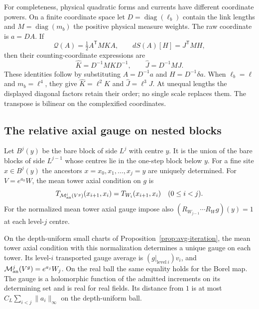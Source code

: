 \documentclass[11pt,letterpaper,reqno]{amsart}
\makeatletter
\numberwithin{equation}{section}
\theoremstyle{definition}
\newcommand{\ms@minorstart}{%
  \pushQED{\qed}\renewcommand{\qedsymbol}{$\blacksquare$}}
\newenvironment{proposition}[1][]{\ms@minorstart\ms@proposition[#1]}
  {\popQED\endms@proposition}
\theoremstyle{remark}
\makeatother
\begin{document}
For completeness, physical quadratic forms and currents have
different coordinate powers. On a finite coordinate space let
$D=\operatorname{diag}(\ell_b)$ contain the link lengths and
$M=\operatorname{diag}(m_b)$ the positive physical measure weights.
The raw coordinate is $a=DA$. If
\[
 \mathcal Q(A)=\tfrac12 A^{\mathsf T}MK A,\qquad
 dS(A)[H]=J^{\mathsf T}MH,
\]
then their counting-coordinate expressions are
\begin{equation}\label{eq:physical-raw-conversion}
 \widehat K=D^{-1}MKD^{-1},\qquad
 \widehat J=D^{-1}MJ.
\end{equation}
These identities follow by substituting $A=D^{-1}a$ and
$H=D^{-1}\delta a$. When $\ell_b=\ell$ and $m_b=\ell^4$,
they give $\widehat K=\ell^2 K$ and $\widehat J=\ell^3 J$.
At unequal lengths the displayed diagonal factors retain their
order; no single scale replaces them. The transpose is bilinear
on the complexified coordinates.

\subsection{The relative axial gauge on nested blocks}

Let \(B^j(y)\) be the bare block of side \(L^j\) with centre \(y\).
It is the union of the bare blocks of side \(L^{j-1}\) whose centres
lie in the one-step block below \(y\). For a fine site \(x\in B^j(y)\)
the ancestors \(x=x_0,x_1,\ldots,x_j=y\) are uniquely determined.
For \(V=e^{a_0}W\), the mean tower axial condition on \(g\) is
\[
 T_{\mathcal M_{\rm an}^i(V^g)}(x_{i+1},x_i)=T_{W_i}(x_{i+1},x_i)
      \quad (0\le i<j).
\]
For the normalized mean tower axial gauge impose also
\((R_{W_{j-1}}\cdots R_Wg)(y)=1\) at each level-\(j\) centre.

\begin{proposition}[Normalized tower axialization]\label{prop:gauge-tower}
On the depth-uniform small charts of Proposition~\ref{prop:avg-iteration},
the mean tower
axial condition with this normalization determines a unique gauge on
each tower. Its level-\(i\) transported gauge average is
\((g|_{\mathrm{level}\ i})v_i\), and
\(\mathcal M_{\rm an}^j(V^g)=e^{a_j}W_j\).
On the real ball the same equality holds for the Borel map.
The gauge is a holomorphic function of the admitted increments on
its determining set and is real for real fields. Its distance
from \(1\) is at most \(C_L\sum_{i<j}\|a_i\|_\infty\) on the
depth-uniform ball.
\end{proposition}
\end{document}
